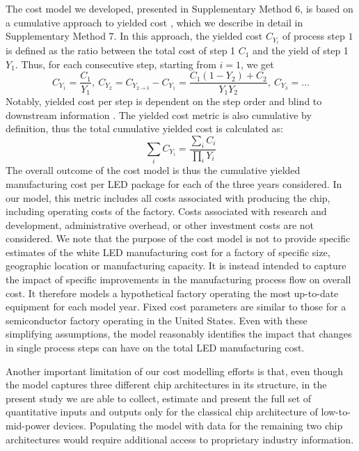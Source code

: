 \documentclass[parskip=full]{article}
\begin{document}
The cost model we developed, presented in Supplementary Method 6, is based on a cumulative approach to yielded cost \cite{becker2001use}, which we describe in detail in Supplementary Method 7. In this approach, the yielded cost $C_{Y_i}$ of process step $1$ is defined as the ratio between the total cost of step 1 $C_1$ and the yield of step 1 $Y_1$. Thus, for each consecutive step, starting from $i=1$, we get
%
\begin{equation}
    C_{Y_1} = \frac{C_1}{Y_1}, \ C_{Y_2} = C_{Y_{2 \rightarrow 3}} - C_{Y_1} = \frac{C_1(1-Y_2)+C_2}{Y_1Y_2}, \ C_{Y_3}=\dots
\end{equation}
%
Notably, yielded cost per step is dependent on the step order and blind to downstream information \cite{becker2001use}. The yielded cost metric is also cumulative by definition, thus the total cumulative yielded cost is calculated as:
%
\begin{equation}
    \sum_i C_{Y_i} = \frac{\sum_i C_i}{\prod_i Y_i}
\end{equation}
%
The overall outcome of the cost model is thus the cumulative yielded manufacturing cost per LED package for each of the three years considered. In our model, this metric includes all costs associated with producing the chip, including operating costs of the factory. Costs associated with research and development, administrative overhead, or other investment costs are not considered. We note that the purpose of the cost model is not to provide specific estimates of the white LED manufacturing cost for a factory of specific size, geographic location or manufacturing capacity. It is instead intended to capture the impact of specific improvements in the manufacturing process flow on overall cost. It therefore models a hypothetical factory operating the most up-to-date equipment for each model year. Fixed cost parameters are similar to those for a semiconductor factory operating in the United States. Even with these simplifying assumptions, the model reasonably identifies the impact that changes in single process steps can have on the total LED manufacturing cost.

Another important limitation of our cost modelling efforts is that, even though the model captures three different chip architectures in its structure, in the present study we are able to collect, estimate and present the full set of quantitative inputs and outputs only for the classical chip architecture of low-to-mid-power devices. Populating the model with data for the remaining two chip architectures would require additional access to proprietary industry information.
\end{document}
